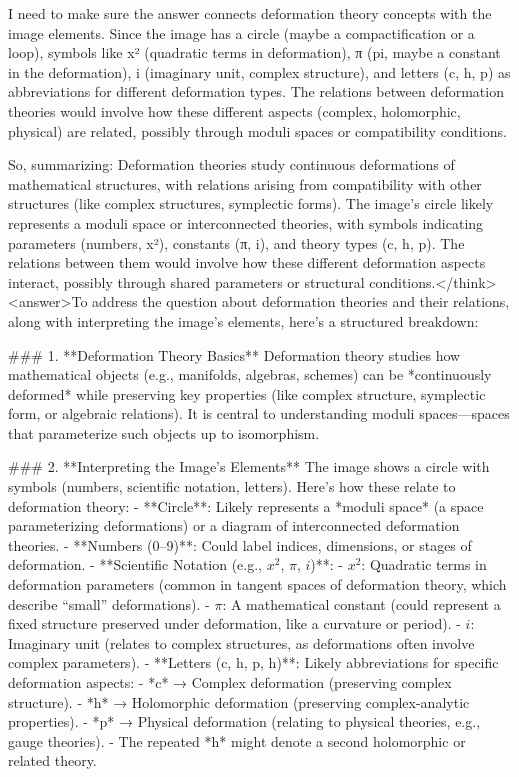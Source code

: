 I need to make sure the answer connects deformation theory concepts with the image elements. Since the image has a circle (maybe a compactification or a loop), symbols like x² (quadratic terms in deformation), π (pi, maybe a constant in the deformation), i (imaginary unit, complex structure), and letters (c, h, p) as abbreviations for different deformation types. The relations between deformation theories would involve how these different aspects (complex, holomorphic, physical) are related, possibly through moduli spaces or compatibility conditions.

So, summarizing: Deformation theories study continuous deformations of mathematical structures, with relations arising from compatibility with other structures (like complex structures, symplectic forms). The image's circle likely represents a moduli space or interconnected theories, with symbols indicating parameters (numbers, x²), constants (π, i), and theory types (c, h, p). The relations between them would involve how these different deformation aspects interact, possibly through shared parameters or structural conditions.</think><answer>To address the question about deformation theories and their relations, along with interpreting the image’s elements, here’s a structured breakdown:  


### 1. **Deformation Theory Basics**  
Deformation theory studies how mathematical objects (e.g., manifolds, algebras, schemes) can be *continuously deformed* while preserving key properties (like complex structure, symplectic form, or algebraic relations). It is central to understanding moduli spaces—spaces that parameterize such objects up to isomorphism.  

### 2. **Interpreting the Image’s Elements**  
The image shows a circle with symbols (numbers, scientific notation, letters). Here’s how these relate to deformation theory:  
- **Circle**: Likely represents a *moduli space* (a space parameterizing deformations) or a diagram of interconnected deformation theories.  
- **Numbers (0–9)**: Could label indices, dimensions, or stages of deformation.  
- **Scientific Notation (e.g., \(x^2\), \(\pi\), \(i\))**:  
  - \(x^2\): Quadratic terms in deformation parameters (common in tangent spaces of deformation theory, which describe “small” deformations).  
  - \(\pi\): A mathematical constant (could represent a fixed structure preserved under deformation, like a curvature or period).  
  - \(i\): Imaginary unit (relates to complex structures, as deformations often involve complex parameters).  
- **Letters (c, h, p, h)**: Likely abbreviations for specific deformation aspects:  
  - *c* → Complex deformation (preserving complex structure).  
  - *h* → Holomorphic deformation (preserving complex-analytic properties).  
  - *p* → Physical deformation (relating to physical theories, e.g., gauge theories).  
  - The repeated *h* might denote a second holomorphic or related theory.    

